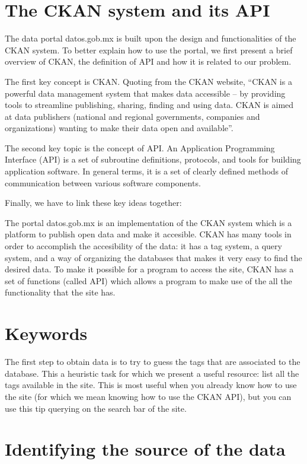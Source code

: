 \documentclass[]{book}
\begin{document}
\section{The CKAN system and its API}\label{the-ckan-system-and-its-api}

The data portal datos.gob.mx is built upon the design and
functionalities of the CKAN system. To better explain how to use the
portal, we first present a brief overview of CKAN, the definition of API
and how it is related to our problem.

The first key concept is CKAN. Quoting from the CKAN website, ``CKAN is
a powerful data management system that makes data accessible -- by
providing tools to streamline publishing, sharing, finding and using
data. CKAN is aimed at data publishers (national and regional
governments, companies and organizations) wanting to make their data
open and available''.

The second key topic is the concept of API. An Application Programming
Interface (API) is a set of subroutine definitions, protocols, and tools
for building application software. In general terms, it is a set of
clearly defined methods of communication between various software
components.

Finally, we have to link these key ideas together:

The portal datos.gob.mx is an implementation of the CKAN system which is
a platform to publish open data and make it accesible. CKAN has many
tools in order to accomplish the accesibility of the data: it has a tag
system, a query system, and a way of organizing the databases that makes
it very easy to find the desired data. To make it possible for a program
to access the site, CKAN has a set of functions (called API) which
allows a program to make use of the all the functionality that the site
has.

\section{Keywords}\label{keywords}

The first step to obtain data is to try to guess the tags that are
associated to the database. This a heuristic task for which we present a
useful resource: list all the tags available in the site. This is most
useful when you already know how to use the site (for which we mean
knowing how to use the CKAN API), but you can use this tip querying on
the search bar of the site.

\section{Identifying the source of the
data}\label{identifying-the-source-of-the-data}
\end{document}
